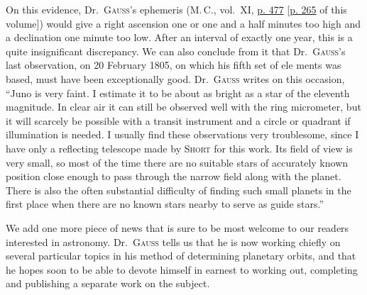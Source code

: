 \par\indent On this evidence, Dr.\ \textsc{Gauss}’s ephemeris (M.\,C., vol.\ XI, \href{https://www.digitale-sammlungen.de/en/view/bsb10538603?page=491}{p. 477} [\hyperlink{native-270}{p. 265} of this volume]) would give a right ascension one or one and a half minutes too high and a declination one minute too low. After an interval of exactly one year, this is a quite insignificant discrepancy. We can also conclude from it that Dr.\ \textsc{Gauss}’s last observation, on 20 February 1805, on which his fifth set of ele%
%
ments was based, must have been exceptionally good. Dr.~\textsc{Gauss} writes on this occasion, “Juno is very faint. I estimate it to be about as bright as a star of the eleventh magnitude. In clear air it can still be observed well with the ring micrometer, but it will scarcely be possible with a transit instrument and a circle or quadrant if illumination is needed. I usually find these observations very troublesome, since I have only a reflecting telescope made by \textsc{Short} for this work. Its field of view is very small, so most of the time there are no suitable stars of accurately known position close enough to pass through the narrow field along with the planet. There is also the often substantial difficulty of finding such small planets in the first place when there are no known stars nearby to serve as guide stars.”

\par\indent We add one more piece of news that is sure to be most welcome to our readers interested in astronomy. Dr.~\textsc{Gauss} tells us that he is now working chiefly on several particular topics in his method of determining planetary orbits, and that he hopes soon to be able to devote himself in earnest to working out, completing and publishing a separate work on the subject.

\begin{flushright}
\end{flushright}
